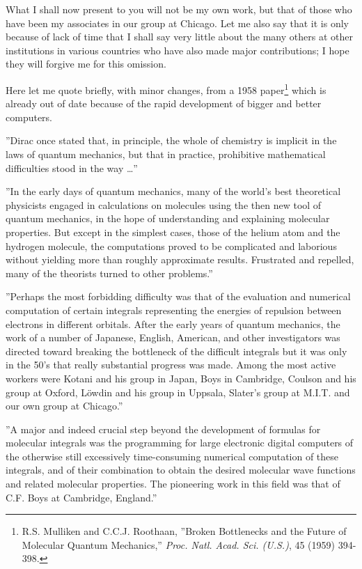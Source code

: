 \documentclass[11pt]{memoir}
\begin{document}
What I shall now present to you will not be my own work, but that of those who have been my associates in our group at Chicago.  Let me also say that it is only because of lack of time that I shall say very little about the many others at other institutions in various countries who have also made major contributions; I hope they will forgive me for this omission.

Here let me quote briefly, with minor changes, from a 1958 paper\footnote{R.S. Mulliken and C.C.J. Roothaan, ''Broken Bottlenecks and the Future of Molecular Quantum Mechanics,'' \emph{Proc. Natl. Acad. Sci. (U.S.)}, 45 (1959) 394-398.} which is already out of date because of the rapid development of bigger and better computers.

''Dirac once stated that, in principle, the whole of chemistry is implicit in the laws of quantum mechanics, but that in practice, prohibitive mathematical difficulties stood in the way \ldots ''

''In the early days of quantum mechanics, many of the world's best theoretical physicists engaged in calculations on molecules using the then new tool of quantum mechanics, in the hope of understanding and explaining molecular properties.  But except in the simplest cases, those of the helium atom and the hydrogen molecule, the computations proved to be complicated and laborious without yielding more than roughly approximate results.  Frustrated and repelled, many of the theorists turned to other problems.''

''Perhaps the most forbidding difficulty was that of the evaluation and numerical computation of certain integrals representing the energies of repulsion between electrons in different orbitals.  After the early years of quantum mechanics, the work of a number of Japanese, English, American, and other investigators was directed toward breaking the bottleneck of the difficult integrals but it was only in the 50's that really substantial progress was made.  Among the most active workers were Kotani and his group in Japan, Boys in Cambridge, Coulson and his group at Oxford, L\"{o}wdin and his group in Uppsala, Slater's group at M.I.T. and our own group at Chicago.''

''A major and indeed crucial step beyond the development of formulas for molecular integrals was the programming for large electronic digital computers of the otherwise still excessively time-consuming numerical computation of these integrals, and of their combination to obtain the desired molecular wave functions and related molecular properties.  The pioneering work in this field was that of C.F. Boys at Cambridge, England.''
\end{document}
